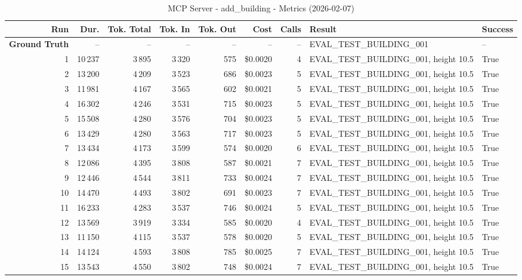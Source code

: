 \documentclass[a4paper,11pt]{article}
\begin{document}
\begin{table}[ht]
\centering
\scriptsize
\caption{MCP Server - add\_building - Metrics (2026-02-07)}
\label{tab:mcp\_add\_building\_metrics\_2026-02-07}
\begin{tabular}{r r r r r r r p{3cm} l}
\hline
Run & Dur. & Tok. Total & Tok. In & Tok. Out & Cost & Calls & Result & Success \\
\hline
\textbf{Ground Truth} & -- & -- & -- & -- & -- & -- & EVAL\_TEST\_BUILDING\_001 & -- \\
\hline
1 & 10\,237 & 3\,895 & 3\,320 & 575 & \$0.0020 & 4 & EVAL\_TEST\_BUILDING\_001, height 10.5 & True \\
2 & 13\,200 & 4\,209 & 3\,523 & 686 & \$0.0023 & 5 & EVAL\_TEST\_BUILDING\_001, height 10.5 & True \\
3 & 11\,981 & 4\,167 & 3\,565 & 602 & \$0.0021 & 5 & EVAL\_TEST\_BUILDING\_001, height 10.5 & True \\
4 & 16\,302 & 4\,246 & 3\,531 & 715 & \$0.0023 & 5 & EVAL\_TEST\_BUILDING\_001, height 10.5 & True \\
5 & 15\,508 & 4\,280 & 3\,576 & 704 & \$0.0023 & 5 & EVAL\_TEST\_BUILDING\_001, height 10.5 & True \\
6 & 13\,429 & 4\,280 & 3\,563 & 717 & \$0.0023 & 5 & EVAL\_TEST\_BUILDING\_001, height 10.5 & True \\
7 & 13\,434 & 4\,173 & 3\,599 & 574 & \$0.0020 & 6 & EVAL\_TEST\_BUILDING\_001, height 10.5 & True \\
8 & 12\,086 & 4\,395 & 3\,808 & 587 & \$0.0021 & 7 & EVAL\_TEST\_BUILDING\_001, height 10.5 & True \\
9 & 12\,446 & 4\,544 & 3\,811 & 733 & \$0.0024 & 7 & EVAL\_TEST\_BUILDING\_001, height 10.5 & True \\
10 & 14\,470 & 4\,493 & 3\,802 & 691 & \$0.0023 & 7 & EVAL\_TEST\_BUILDING\_001, height 10.5 & True \\
11 & 16\,233 & 4\,283 & 3\,537 & 746 & \$0.0024 & 5 & EVAL\_TEST\_BUILDING\_001, height 10.5 & True \\
12 & 13\,569 & 3\,919 & 3\,334 & 585 & \$0.0020 & 4 & EVAL\_TEST\_BUILDING\_001, height 10.5 & True \\
13 & 11\,150 & 4\,115 & 3\,537 & 578 & \$0.0020 & 5 & EVAL\_TEST\_BUILDING\_001, height 10.5 & True \\
14 & 14\,124 & 4\,593 & 3\,808 & 785 & \$0.0025 & 7 & EVAL\_TEST\_BUILDING\_001, height 10.5 & True \\
15 & 13\,543 & 4\,550 & 3\,802 & 748 & \$0.0024 & 7 & EVAL\_TEST\_BUILDING\_001, height 10.5 & True \\

\end{tabular}
\end{table}
\end{document}
